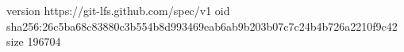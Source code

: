version https://git-lfs.github.com/spec/v1
oid sha256:26c5ba68c83880c3b554b8d993469eab6ab9b203b07c7c24b4b726a2210f9c42
size 196704
